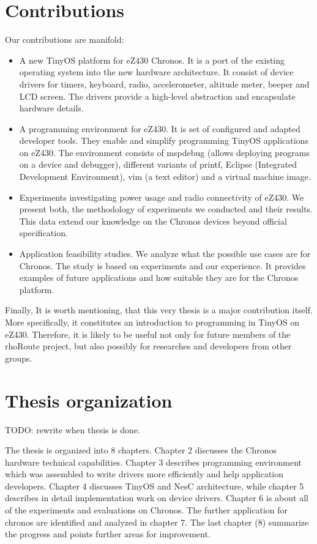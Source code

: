 \section{Contributions}
Our contributions are manifold:
\begin{itemize}
  \item A new TinyOS platform for eZ430 Chronos.
It is a port of the existing operating system into the new hardware architecture.
It consist of device drivers for timers, keyboard, radio, accelerometer, altitude meter, beeper and LCD screen.
The drivers provide a high-level abstraction and encapsulate hardware details.
  \item A programming environment for eZ430. It is set of configured and adapted developer tools. They enable and simplify programming TinyOS applications on eZ430.
The environment consists of mspdebug (allows deploying programs on a device and debugger), different variants of printf, Eclipse (Integrated Development Environment), vim (a text editor) and a virtual machine image.
  \item Experiments investigating power usage and radio connectivity of eZ430.
We present both, the methodology of experiments we conducted and their results.
This data extend our knowledge on the Chronos devices beyond official specification.
  \item Application feasibility studies.
We analyze what the possible use cases are for Chronos.
The study is based on experiments and our experience.
It provides examples of future applications and how suitable they are for the Chronos platform.
\end{itemize}

Finally, It is worth mentioning, that this very thesis is a major contribution itself. More specifically, it constitutes an introduction to programming in TinyOS on eZ430. Therefore, it is likely to be useful not only for future members of the rhoRoute project, but also possibly for researches and developers from other groups.

\section{Thesis organization}
TODO: rewrite when thesis is done.

The thesis is organized into 8 chapters. Chapter 2 discusses the Chronos hardware technical capabilities. Chapter 3 describes programming environment which was assembled to write drivers more efficiently and help application developers. Chapter 4 discusses TinyOS and NesC architecture, while chapter 5 describes in detail implementation work on device drivers. Chapter 6 is about all of the experiments and evaluations on Chronos. The further application for chronos are identified and analyzed in chapter 7. The last chapter (8) summarize the progress and points further areas for improvement.
